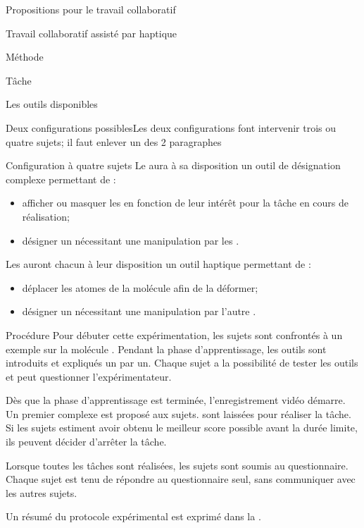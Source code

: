 \documentclass[myfrancais]{mythesis}
\begin{document}
\begin{mypart}{Propositions pour le travail collaboratif}
\begin{mychapter}{Travail collaboratif assisté par haptique}
\begin{mysection}{Méthode}
\begin{mysubsection}{Tâche}
\begin{mysubsubsection}{Les outils disponibles}
\begin{myTodo}{Deux configurations possibles}{Les deux configurations font intervenir trois ou quatre sujets; il faut enlever un des 2 paragraphes}
\begin{myparagraph}{Configuration à quatre sujets}
								Le  aura à sa disposition un outil de désignation complexe permettant de :
								\begin{itemize}
									\item afficher ou masquer les  en fonction de leur intérêt pour la tâche en cours de réalisation;
									\item désigner un  nécessitant une manipulation par les .
								\end{itemize}
							\end{myparagraph}
						\end{myTodo}

						Les  auront chacun à leur disposition un outil haptique permettant de :
						\begin{itemize}
							\item déplacer les atomes de la molécule afin de la déformer;
							\item désigner un  nécessitant une manipulation par l'autre .
						\end{itemize}
					\end{mysubsubsection}
				\end{mysubsection}
				\begin{mysubsection}{Procédure}
					Pour débuter cette expérimentation, les sujets sont confrontés à un exemple sur la molécule .
					Pendant la phase d'apprentissage, les outils sont introduits et expliqués un par un.
					Chaque sujet a la possibilité de tester les outils et peut questionner l'expérimentateur.

					Dès que la phase d'apprentissage est terminée, l'enregistrement vidéo démarre.
					Un premier complexe est proposé aux sujets.
					 sont laissées pour réaliser la tâche.
					Si les sujets estiment avoir obtenu le meilleur score possible avant la durée limite, ils peuvent décider d'arrêter la tâche.

					Lorsque toutes les tâches sont réalisées, les sujets sont soumis au questionnaire.
					Chaque sujet est tenu de répondre au questionnaire seul, sans communiquer avec les autres sujets.

					Un résumé du protocole expérimental est exprimé dans la .


\end{mysubsection}
\end{mysection}
\end{mychapter}
\end{mypart}
\end{document}
